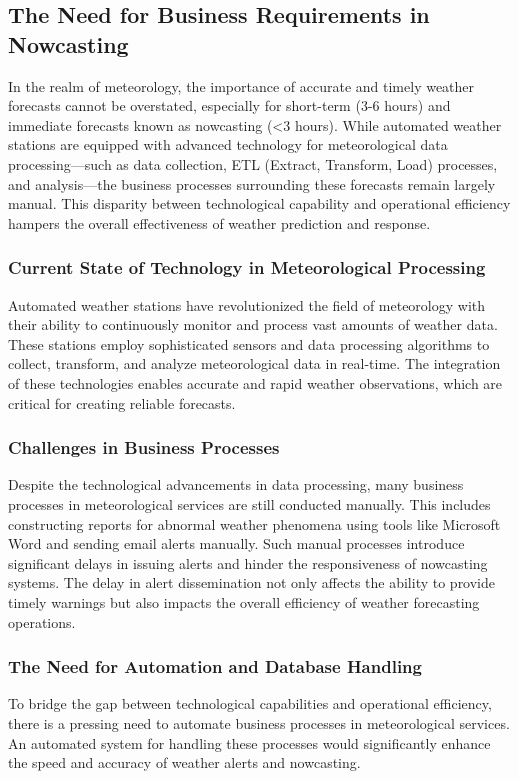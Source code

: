 \subsection{The Need for Business Requirements in Nowcasting}

In the realm of meteorology, the importance of accurate and timely weather
forecasts cannot be overstated, especially for short-term (3-6 hours) and
immediate forecasts known as nowcasting (<3 hours). While automated weather
stations are equipped with advanced technology for meteorological data
processing—such as data collection, ETL (Extract, Transform, Load) processes,
and analysis—the business processes surrounding these forecasts remain largely
manual. This disparity between technological capability and operational
efficiency hampers the overall effectiveness of weather prediction and response.

\subsubsection*{Current State of Technology in Meteorological Processing}
Automated weather stations have revolutionized the field of meteorology with
their ability to continuously monitor and process vast amounts of weather data.
These stations employ sophisticated sensors and data processing algorithms to
collect, transform, and analyze meteorological data in real-time. The
integration of these technologies enables accurate and rapid weather
observations, which are critical for creating reliable forecasts.

\subsubsection*{Challenges in Business Processes}
Despite the technological advancements in data processing, many business
processes in meteorological services are still conducted manually. This includes
constructing reports for abnormal weather phenomena using tools like Microsoft
Word and sending email alerts manually. Such manual processes introduce
significant delays in issuing alerts and hinder the responsiveness of nowcasting
systems. The delay in alert dissemination not only affects the ability to
provide timely warnings but also impacts the overall efficiency of weather
forecasting operations.

\subsubsection*{The Need for Automation and Database Handling}
To bridge the gap between technological capabilities and operational efficiency,
there is a pressing need to automate business processes in meteorological
services. An automated system for handling these processes would significantly
enhance the speed and accuracy of weather alerts and nowcasting.

